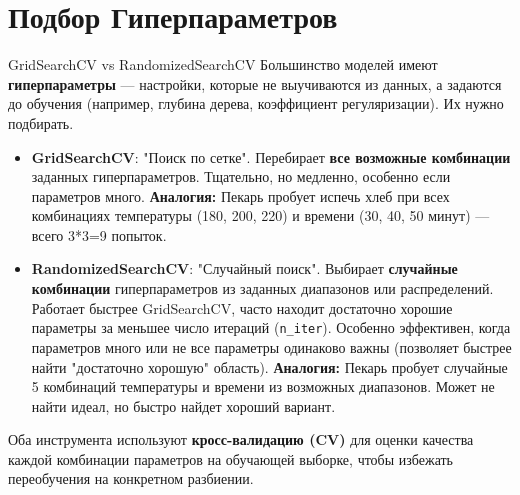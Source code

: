 \section{Подбор Гиперпараметров}

\begin{alerttextbox}{GridSearchCV vs RandomizedSearchCV}
    Большинство моделей имеют \textbf{гиперпараметры} — настройки, которые не выучиваются из данных, а задаются до обучения (например, глубина дерева, коэффициент регуляризации). Их нужно подбирать.
    \begin{itemize}
        \item \textbf{GridSearchCV}: "Поиск по сетке". Перебирает \textbf{все возможные комбинации} заданных гиперпараметров. Тщательно, но медленно, особенно если параметров много. \textbf{Аналогия:} Пекарь пробует испечь хлеб при всех комбинациях температуры (180, 200, 220) и времени (30, 40, 50 минут) — всего 3*3=9 попыток.
        \item \textbf{RandomizedSearchCV}: "Случайный поиск". Выбирает \textbf{случайные комбинации} гиперпараметров из заданных диапазонов или распределений. Работает быстрее GridSearchCV, часто находит достаточно хорошие параметры за меньшее число итераций (\texttt{n\_iter}). Особенно эффективен, когда параметров много или не все параметры одинаково важны (позволяет быстрее найти "достаточно хорошую" область). \textbf{Аналогия:} Пекарь пробует случайные 5 комбинаций температуры и времени из возможных диапазонов. Может не найти идеал, но быстро найдет хороший вариант.
    \end{itemize}
    Оба инструмента используют \textbf{кросс-валидацию (CV)} для оценки качества каждой комбинации параметров на обучающей выборке, чтобы избежать переобучения на конкретном разбиении.
\end{alerttextbox}

